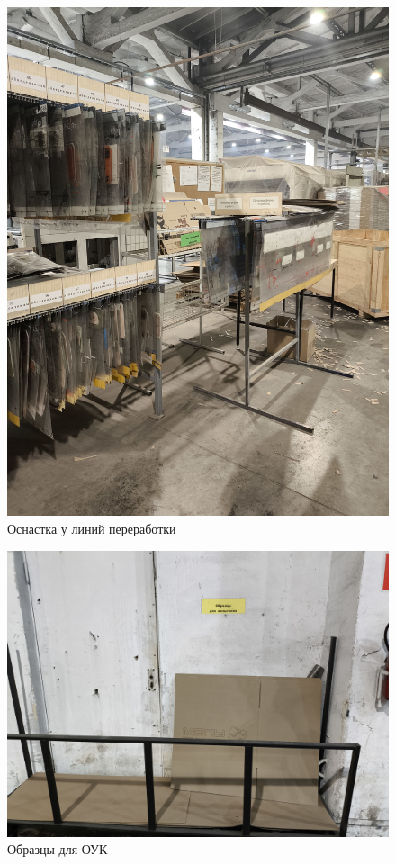 \begin{figure}
\begin{center}
 \includegraphics[height=0.8\textheight, keepaspectratio]{Pics/II хранение фпф.jpg}
\end{center}
 \caption{Оснастка у линий переработки}
 \label{pic:II хранение фпф}
\end{figure}

\begin{figure}
\begin{center}
 \includegraphics[height=0.5\textheight, keepaspectratio]{Pics/V образцы для ОТК.jpg}
\end{center}
 \caption{Образцы для ОУК}
 \label{pic:V образцы для ОТК}
\end{figure}


